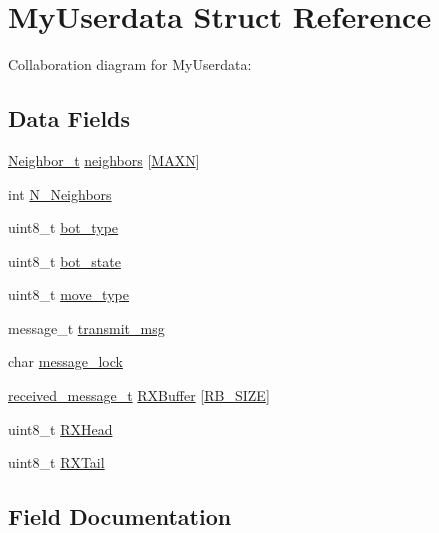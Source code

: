 \hypertarget{structMyUserdata}{}\section{My\+Userdata Struct Reference}
\label{structMyUserdata}


Collaboration diagram for My\+Userdata\+:
\subsection*{Data Fields}
\begin{DoxyCompactItemize}
\item 
\hyperlink{structNeighbor__t}{Neighbor\+\_\+t} \hyperlink{structMyUserdata_a150f618b3955b43b608b42fa20c3ed41}{neighbors} \mbox{[}\hyperlink{edge_8h_ad1f79d9d99776d7353c6659c307c83c6}{M\+A\+XN}\mbox{]}
\item 
int \hyperlink{structMyUserdata_a477d936b3271e7574e4606dbf6eefcd1}{N\+\_\+\+Neighbors}
\item 
uint8\+\_\+t \hyperlink{structMyUserdata_a58dcaaa4571d8840cdf5e9d0b606e30e}{bot\+\_\+type}
\item 
uint8\+\_\+t \hyperlink{structMyUserdata_ae83961f5158de8f19258fa7fc9f35c6d}{bot\+\_\+state}
\item 
uint8\+\_\+t \hyperlink{structMyUserdata_a133280adb0842e93ef763014465a9621}{move\+\_\+type}
\item 
message\+\_\+t \hyperlink{structMyUserdata_abc5483cce2329b4f57da45bdfcf62bc3}{transmit\+\_\+msg}
\item 
char \hyperlink{structMyUserdata_a3968d1f63a4148b9166328e9cb9a6185}{message\+\_\+lock}
\item 
\hyperlink{structreceived__message__t}{received\+\_\+message\+\_\+t} \hyperlink{structMyUserdata_a2e9fa22da4dc22f59cd2789d74e546bf}{R\+X\+Buffer} \mbox{[}\hyperlink{edge_8h_a4ab5f7800f96dec4076a4a0c8aa634b7}{R\+B\+\_\+\+S\+I\+ZE}\mbox{]}
\item 
uint8\+\_\+t \hyperlink{structMyUserdata_aa652a695856248e2b81bd644d7924191}{R\+X\+Head}
\item 
uint8\+\_\+t \hyperlink{structMyUserdata_adc9f6f96b5c39be31f5d1842f67aaa3e}{R\+X\+Tail}
\end{DoxyCompactItemize}


\subsection{Field Documentation}
\mbox{\label{structMyUserdata_ae83961f5158de8f19258fa7fc9f35c6d}} 
